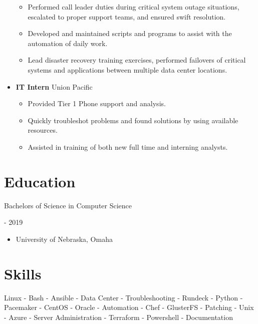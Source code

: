 \documentclass[10pt, a4paper]{article}
\begin{document}
\begin{itemize}
\begin{itemize}
        \item Performed call leader duties during critical system outage situations, escalated to proper support teams, and ensured swift resolution.
        \item Developed and maintained scripts and programs to assist with the automation of daily work.
        \item Lead disaster recovery training exercises, performed failovers of critical systems and applications between multiple data center locations.
    \end{itemize}
    \item \textbf{IT Intern} Union Pacific
    \begin{itemize}
        \item Provided Tier 1 Phone support and analysis.
        \item Quickly troubleshot problems and found solutions by using available resources.
        \item Assisted in training of both new full time and interning analysts.
    \end{itemize}
\end{itemize}
\section*{Education}
    \begin{minipage}{0.5\textwidth} %
        \raggedright %
        Bachelors of Science in Computer Science
      \end{minipage}
      \begin{minipage}{0.5\textwidth} %
         \-- 2019
      \end{minipage}
      \begin{itemize}
      \item University of Nebraska, Omaha
    \end{itemize}

\section*{Skills}
Linux - Bash - Ansible - Data Center - Troubleshooting - Rundeck - Python - Pacemaker - CentOS - Oracle - Automation - Chef - GlusterFS - Patching - Unix - Azure - Server Administration - Terraform - Powershell - Documentation
\end{document}
